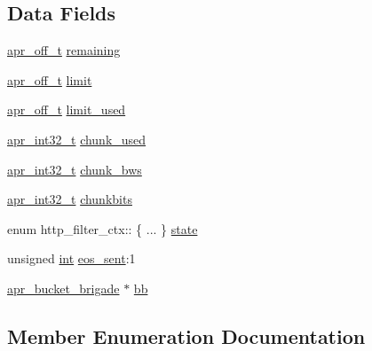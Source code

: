 \subsection*{Data Fields}
\begin{DoxyCompactItemize}
\item 
\hyperlink{group__apr__platform_ga6938af9075cec15c88299109381aa984}{apr\+\_\+off\+\_\+t} \hyperlink{structhttp__filter__ctx_a669e4805b3738b515c0bc6d56f0f7ea7}{remaining}
\item 
\hyperlink{group__apr__platform_ga6938af9075cec15c88299109381aa984}{apr\+\_\+off\+\_\+t} \hyperlink{structhttp__filter__ctx_ae3dfd19fe37ee4d2d690ca352f6d8601}{limit}
\item 
\hyperlink{group__apr__platform_ga6938af9075cec15c88299109381aa984}{apr\+\_\+off\+\_\+t} \hyperlink{structhttp__filter__ctx_a39ce71ac22882c37594f7ff5a1d6bbe6}{limit\+\_\+used}
\item 
\hyperlink{group__apr__platform_ga21ef1e35fd3ff9be386f3cb20164ff02}{apr\+\_\+int32\+\_\+t} \hyperlink{structhttp__filter__ctx_af2c2e8f48a907b5515b8c42252be727d}{chunk\+\_\+used}
\item 
\hyperlink{group__apr__platform_ga21ef1e35fd3ff9be386f3cb20164ff02}{apr\+\_\+int32\+\_\+t} \hyperlink{structhttp__filter__ctx_a6a0a6b7f582a0a905406b9159456a8d7}{chunk\+\_\+bws}
\item 
\hyperlink{group__apr__platform_ga21ef1e35fd3ff9be386f3cb20164ff02}{apr\+\_\+int32\+\_\+t} \hyperlink{structhttp__filter__ctx_a7b6df91816e6a00976d21cbf5eb8813e}{chunkbits}
\item 
enum http\+\_\+filter\+\_\+ctx\+:: \{ ... \}  \hyperlink{structhttp__filter__ctx_a2e84a1c737dd4daa565b328c875402cb}{state}
\item 
unsigned \hyperlink{pcre_8txt_a42dfa4ff673c82d8efe7144098fbc198}{int} \hyperlink{structhttp__filter__ctx_aaf41999f4964aefe0f6947e7482e644f}{eos\+\_\+sent}\+:1
\item 
\hyperlink{structapr__bucket__brigade}{apr\+\_\+bucket\+\_\+brigade} $\ast$ \hyperlink{structhttp__filter__ctx_a430be4ba8f438622f652319917aa565f}{bb}
\end{DoxyCompactItemize}


\subsection{Member Enumeration Documentation}
